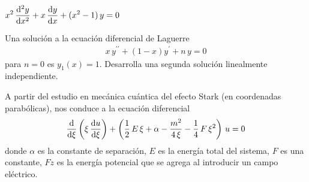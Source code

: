 \begin{milista}
\begin{milista}
\begin{fleqn}
\item $ \displaystyle x^{2} \, \dv[2]{y}{x} + x \,\dv{y}{x} + (x^{2} - 1) \, y = 0 $
\end{fleqn}
\end{milista}
\item Una solución a la ecuación diferencial de Laguerre
\begin{align*}
x \, y^{\prime \prime} + (1-x) y^\prime + n \, y = 0
\end{align*}
para $n=0$ es $y_{1}(x)=1$. Desarrolla una segunda solución linealmente independiente.
\item A partir del estudio en mecánica cuántica del efecto Stark (en coordenadas parabólicas), nos conduce a la ecuación diferencial
\begin{align*}
\dv{\xi} \left( \xi\, \dv{u}{\xi} \right) + \left( \dfrac{1}{2} \, E \, \xi + \alpha - \dfrac{m^{2}}{4 \, \xi} - \dfrac{1}{4} \, F \, \xi^{2} \right) \, u = 0
\end{align*}
donde $\alpha$ es la constante de separación, $E$ es la energía total del sistema, $F$ es una constante, $Fz$ es la energía potencial que se agrega al introducir un campo eléctrico.


\end{milista}
